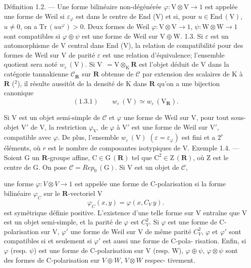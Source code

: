 \documentclass[11pt]{article}
\newcommand{\scanpage}[1]{\par\bigskip\noindent{\small\sffamily[scan #1]}\par}
\newcommand{\mspage}[1]{{\small\sffamily[p.\,#1]}}
\newcommand{\hand}[1]{\textcolor{blue}{#1}}
\begin{document}
Définition 1.2. --- Une forme bilinéaire non-dégénérée $\varphi : \mathrm{V}\otimes\mathrm{V} \to 1$
est appelée une forme de Weil si $\varepsilon_{\varphi}$ est dans le centre de End (V) et si,
pour $u\in\mathrm{End}\,(\mathrm{V})$, $u\neq 0$, on a $\mathrm{Tr}\,(uu^{\varphi}) > 0$. Deux formes de Weil
$\varphi : \mathrm{V}\otimes\mathrm{V} \to 1$, $\psi : \mathrm{W}\otimes\mathrm{W} \to 1$ sont compatibles si $\varphi\oplus\psi$ est une forme
de Weil sur $\mathrm{V}\oplus\mathrm{W}$.
1.3. Si $\varepsilon$ est un automorphisme de V central dans End (V), la relation
de compatibilité pour des formes de Weil sur V de parité $\varepsilon$ est une relation
d'équivalence; l'ensemble quotient sera noté $w_{\varepsilon}\,(\mathrm{V})$. Si $\mathrm{V}\ \ = \mathrm{V}\otimes_{\mathrm{K}}\mathbf{R}$ est
l'objet déduit de V dans la catégorie tannakienne $\mathcal{C}_{\mathbf{R}}$ sur $\mathbf{R}$ obtenue de $\mathcal{C}$
par extension des scalaires de K à $\mathbf{R}$ (${}^2$), il résulte aussitôt de la densité
de K dans $\mathbf{R}$ qu'on a une bijection canonique
\[ (1.3.1) \qquad w_{\varepsilon}\,(\mathrm{V}) \simeq w_{\varepsilon}\,(\mathrm{V}_{\mathbf{R}}). \]

Si V est un objet semi-simple de $\mathcal{C}$ et $\varphi$ une forme de Weil sur V, pour tout
sous-objet V$'$ de V, la restriction $\varphi_{\mathrm{V}'}$ de $\varphi$ à V$'$ est une forme de Weil sur V$'$,
compatible avec $\varphi$. De plus, l'ensemble $w_{\varepsilon}\,(\mathrm{V})$ $(\varepsilon = \varepsilon_{\varphi})$ est fini et a
$2^{r}$ éléments, où $r$ est le nombre de composantes isotypiques de V.
Exemple 1.4. --- Soient G un $\mathbf{R}$-groupe affine, $\mathrm{C}\in\mathrm{G}\,(\mathbf{R})$ tel que $\mathrm{C}^{2}\in\mathrm{Z}\,(\mathbf{R})$,
où Z est le centre de G. On pose $\mathcal{C} = \mathit{Rep}_0\,(\mathrm{G})$. Si V est un objet de $\mathcal{C}$,

\mspage{\hand{61}}

\clearpage
\scanpage{119/62}
\mspage{( 2 )}

une forme $\varphi : V \otimes V \to 1$ est appelée une forme de C-polarisation si la
forme bilinéaire $\varphi_C$ sur le $\mathbf{R}$-vectoriel V
\[ \varphi_C (x, y) = \varphi (x, C_V\, y). \]
est symétrique définie positive. L'existence d'une telle forme sur V entraîne
que V est un objet semi-simple, et la parité de $\varphi$ est $C_V^2$. Si $\varphi$ est une forme
de C-polarisation sur V, $\varphi'$ une forme de Weil sur V de même parité $C_V^2$,
$\varphi$ et $\varphi'$ sont compatibles si et seulement si $\varphi'$ est aussi une forme de C-pola-%
risation. Enfin, si $\varphi$ (resp. $\psi$) est une forme de C-polarisation sur V (resp. W),
$\varphi \oplus \psi$, $\varphi \otimes \psi$ sont des formes de C-polarisation sur $V \oplus W$, $V \otimes W$ respec-%
tivement.
\end{document}
